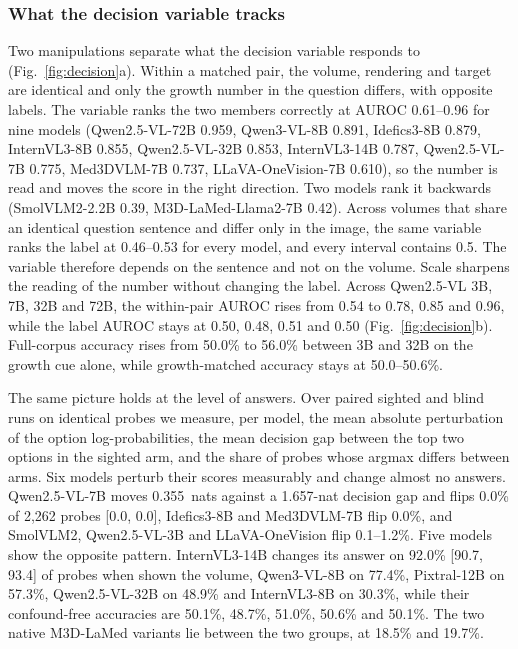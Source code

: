\subsubsection{What the decision variable tracks} Two manipulations
separate what the decision variable responds to (Fig.~\ref{fig:decision}a).
Within a matched pair, the volume, rendering and target are identical and
only the growth number in the question differs, with opposite labels. The
variable ranks the two members correctly at AUROC 0.61--0.96 for nine models
(Qwen2.5-VL-72B 0.959, Qwen3-VL-8B 0.891, Idefics3-8B 0.879, InternVL3-8B
0.855, Qwen2.5-VL-32B 0.853, InternVL3-14B 0.787, Qwen2.5-VL-7B 0.775,
Med3DVLM-7B 0.737, LLaVA-OneVision-7B 0.610), so the number is read and
moves the score in the right direction. Two models rank it backwards
(SmolVLM2-2.2B 0.39, M3D-LaMed-Llama2-7B 0.42). Across volumes that share an
identical question sentence and differ only in the image, the same variable
ranks the label at 0.46--0.53 for every model, and every interval contains
0.5. The variable therefore depends on the sentence and not on the volume.
Scale sharpens the reading of the number without changing the label. Across
Qwen2.5-VL 3B, 7B, 32B and 72B, the within-pair AUROC rises from 0.54 to
0.78, 0.85 and 0.96, while the label AUROC stays at 0.50, 0.48, 0.51 and
0.50 (Fig.~\ref{fig:decision}b). Full-corpus accuracy rises from 50.0\% to
56.0\% between 3B and 32B on the growth cue alone, while growth-matched
accuracy stays at 50.0--50.6\%.

The same picture holds at the level of answers. Over paired sighted and
blind runs on identical probes we measure, per model, the mean absolute
perturbation of the option log-probabilities, the mean decision gap between
the top two options in the sighted arm, and the share of probes whose argmax
differs between arms. Six models perturb their scores
measurably and change almost no answers. Qwen2.5-VL-7B moves 0.355~nats
against a 1.657-nat decision gap and flips 0.0\% of 2{,}262 probes [0.0,
0.0], Idefics3-8B and Med3DVLM-7B flip 0.0\%, and SmolVLM2, Qwen2.5-VL-3B
and LLaVA-OneVision flip 0.1--1.2\%. Five models show the opposite pattern.
InternVL3-14B changes its answer on 92.0\% [90.7, 93.4] of probes when shown
the volume, Qwen3-VL-8B on 77.4\%, Pixtral-12B on 57.3\%, Qwen2.5-VL-32B on
48.9\% and InternVL3-8B on 30.3\%, while their confound-free accuracies are
50.1\%, 48.7\%, 51.0\%, 50.6\% and 50.1\%. The two native M3D-LaMed variants
lie between the two groups, at 18.5\% and 19.7\%.

